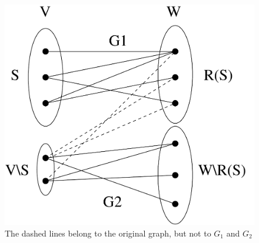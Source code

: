 \begin{figure}[h]
	\centering
	\includegraphics[height=0.35\textheight,keepaspectratio]{hall}
	\caption{The dashed lines belong to the original graph, but not to $G_1$ and $G_2$}\label{hallfig}
\end{figure}





